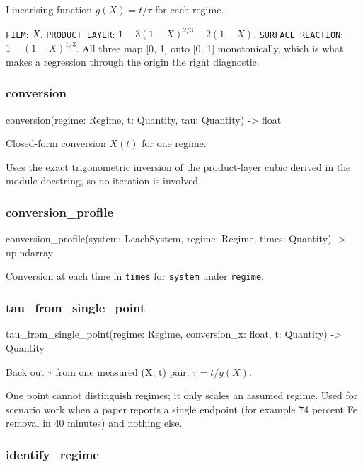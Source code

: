 \documentclass[10pt,a4paper,twoside]{report}
\begin{document}
Linearising function $g(X) = t/\tau$ for each regime.

\texttt{FILM}: $X$. \texttt{PRODUCT\_LAYER}: $1 - 3(1-X)^{2/3} + 2(1-X)$. \texttt{SURFACE\_REACTION}: $1 - (1-X)^{1/3}$. All three map [0, 1] onto [0, 1] monotonically, which is what makes a regression through the origin the right diagnostic.

\subsubsection*{conversion}

\begin{verbatimsmall}
conversion(regime: Regime, t: Quantity, tau: Quantity) -> float
\end{verbatimsmall}

Closed-form conversion $X(t)$ for one regime.

Uses the exact trigonometric inversion of the product-layer cubic derived in the module docstring, so no iteration is involved.

\subsubsection*{conversion\_profile}

\begin{verbatimsmall}
conversion_profile(system: LeachSystem, regime: Regime, times: Quantity) -> np.ndarray
\end{verbatimsmall}

Conversion at each time in \texttt{times} for \texttt{system} under \texttt{regime}.

\subsubsection*{tau\_from\_single\_point}

\begin{verbatimsmall}
tau_from_single_point(regime: Regime, conversion_x: float, t: Quantity) -> Quantity
\end{verbatimsmall}

Back out $\tau$ from one measured (X, t) pair: $\tau = t / g(X)$.

One point cannot distinguish regimes; it only scales an assumed regime. Used for scenario work when a paper reports a single endpoint (for example 74 percent Fe removal in 40 minutes) and nothing else.

\subsubsection*{identify\_regime}
\end{document}
